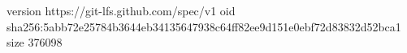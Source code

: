 version https://git-lfs.github.com/spec/v1
oid sha256:5abb72e25784b3644eb34135647938c64ff82ee9d151e0ebf72d83832d52bca1
size 376098
